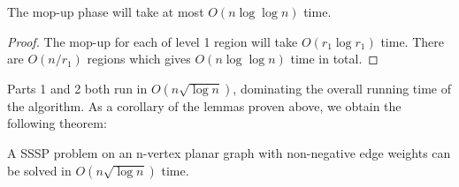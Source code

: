\begin{lemma}
The mop-up phase will take at most $O(n \log \log n)$ time.
\end{lemma}

\begin{proof}
    The mop-up for each of level 1 region will take $O(r_1 \log r_1)$ time. There are $O(n/r_1)$ regions which gives $O(n \log\log n)$ time in total.
\end{proof}

Parts 1 and 2 both run in $O(n \sqrt{\log n})$, dominating the overall running time of the algorithm. As a corollary of the lemmas proven above, we obtain the following theorem:

\begin{theorem} 
A SSSP problem on an n-vertex planar graph with non-negative edge weights can be solved in $O(n \sqrt{\log n})$ time.
\end{theorem}



